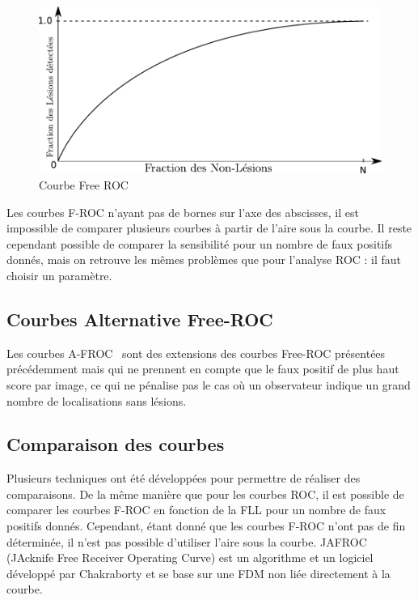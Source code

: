 \begin{figure}[h]
	\label{fig:courbeFROC}
	\begin{center}
	\includegraphics[width=15cm]{images/FROC}
	\end{center}
	\caption{Courbe Free ROC}
\end{figure}

Les courbes F-ROC n'ayant pas de bornes sur l’axe des abscisses, il est impossible de comparer plusieurs courbes à partir de l'aire sous la courbe. Il reste cependant possible de comparer la sensibilité pour un nombre de faux positifs donnés, mais on retrouve les mêmes problèmes que pour l'analyse ROC : il faut choisir un paramètre.

\subsection{Courbes Alternative Free-ROC}

Les courbes A-FROC~\cite{chakraborty1990free} sont des extensions des courbes Free-ROC présentées précédemment mais qui ne prennent en compte que le faux positif de plus haut score par image, ce qui ne pénalise pas le cas où un observateur indique un grand nombre de localisations sans lésions.

\subsection{Comparaison des courbes}
\label{lab:AFROC}
Plusieurs techniques ont été développées pour permettre de réaliser des comparaisons. De la même manière que pour les courbes ROC, il est possible de comparer les courbes F-ROC en fonction de la FLL pour un nombre de faux positifs donnés. Cependant, étant donné que les courbes F-ROC n'ont pas de fin déterminée, il n'est pas possible d'utiliser l'aire sous la courbe. JAFROC\cite{chakraborty2004observer} (JAcknife Free Receiver Operating Curve) est un algorithme et un logiciel développé par Chakraborty et se base sur une FDM non liée directement à la courbe. 


